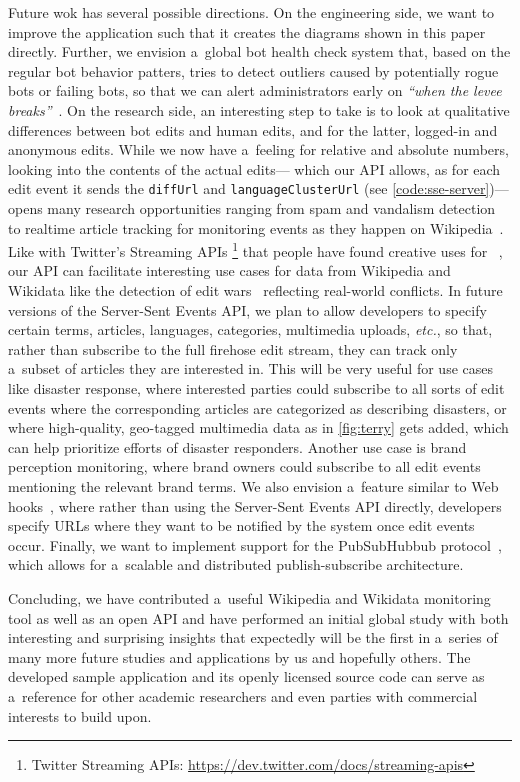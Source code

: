\documentclass{sig-alternate}
\newcommand{\inlinelistingsize}{\fontsize{8pt}{11pt}}
\let\oldurl\url
\renewcommand{\url}[1]{\inlinelistingsize\oldurl{#1}}
\begin{document}
Future wok has several possible directions.
On the engineering side, we want to improve the application
such that it creates the diagrams shown in this paper directly.
Further, we envision a~global bot health check system
that, based on the regular bot behavior patters,
tries to detect outliers caused by
potentially rogue bots or failing bots,
so that we can alert administrators early on
\textit{``when the levee breaks''}~\cite{geiger2013withoutbots}.
On the research side, an interesting step to take
is to look at qualitative differences
between bot edits and human edits, and for the latter,
logged-in and anonymous edits.
While we now have a~feeling for relative and absolute numbers,
looking into the contents of the actual edits---%
which our API allows, as for each edit event it sends the
\texttt{diffUrl} and \texttt{languageClusterUrl}
(see \autoref{code:sse-server})---%
opens many research opportunities ranging from spam
and vandalism detection~\cite{alfonseca2013spam}
to realtime article tracking for monitoring events
as they happen on Wikipedia~\cite{steiner2013mjnomore}.
Like with Twitter's Streaming APIs%
\footnote{Twitter Streaming APIs:
\url{https://dev.twitter.com/docs/streaming-apis}}
that people have found creative uses for%
~\cite{petrovic2010streamingfirststory},
our API can facilitate interesting use cases
for data from Wikipedia and Wikidata like the detection of
edit wars~\cite{yasseri2012conflicts}
reflecting real-world conflicts.
In future versions of the Server-Sent Events API,
we plan to allow developers to specify
certain terms, articles, languages, categories,
multimedia uploads, \emph{etc.},
so that, rather than subscribe to the full firehose edit stream,
they can track only a~subset of articles they are interested in.
This will be very useful for use cases like  
disaster response, where interested parties
could subscribe to all sorts of edit events
where the corresponding articles are categorized as
describing disasters,
or where high-quality, geo-tagged multimedia data
as in \autoref{fig:terry} gets added,
which can help prioritize efforts of disaster responders.
Another use case is brand perception monitoring,
where brand owners could subscribe to all edit events
mentioning the relevant brand terms.
We also envision a~feature similar to Web hooks~\cite{lindsay2007webhooks},
where rather than using the Server-Sent Events API directly,
developers specify URLs where they want to be notified
by the system once edit events occur.
Finally, we want to implement support for the PubSubHubbub
protocol~\cite{fitzpatrick2013pubsubhubbub},
which allows for a~scalable and distributed
publish-subscribe architecture.

Concluding, we have contributed a~useful
Wikipedia and Wikidata monitoring tool
as well as an open API
and have performed an initial global study 
with both interesting and surprising insights that
expectedly will be the first in a~series
of many more future studies and applications by us
and hopefully others.
The developed sample application and its openly licensed
source code can serve as a~reference
for other academic researchers
and even parties with commercial interests
to build upon.
 


\end{document}
